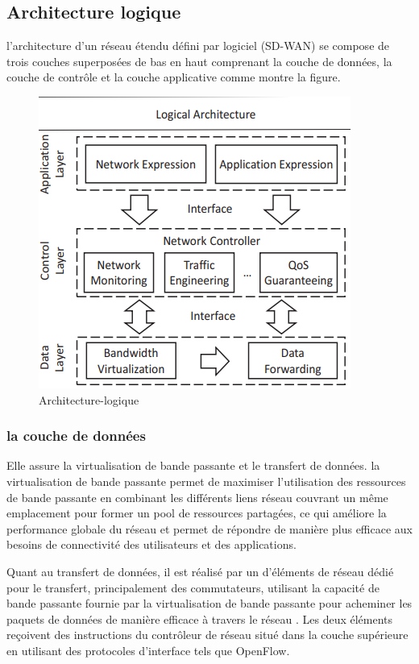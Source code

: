 \subsection{Architecture logique  }
l'architecture d'un réseau étendu défini par logiciel (SD-WAN) se compose de trois couches superposées de bas en haut comprenant la couche de données, la couche de contrôle et la couche applicative comme montre la figure.
	\begin{figure} [H]
	\begin{center}
		\centering
		\hspace*{-0.5cm}
		\includegraphics{../image/arch log}
	\end{center}
	\caption{Architecture-logique}
\end{figure} 
	\subsubsection{    la couche de données }
	    
	    Elle assure la virtualisation de bande passante et le transfert de données. la virtualisation de bande passante permet de maximiser l'utilisation des ressources de bande passante en combinant les différents  liens réseau couvrant un même emplacement pour former un pool de ressources partagées, ce qui améliore la performance globale du réseau et permet de répondre de manière plus efficace aux besoins de connectivité des utilisateurs et des applications.
	    
	    Quant au transfert de données, il est réalisé par un d'éléments de réseau dédié pour le  transfert, principalement des commutateurs, utilisant la capacité de bande passante fournie par la virtualisation de bande passante pour acheminer les paquets de données de manière efficace à travers le réseau . Les deux éléments reçoivent des instructions du contrôleur de réseau situé dans la couche supérieure en utilisant des protocoles d'interface tels que OpenFlow. 

